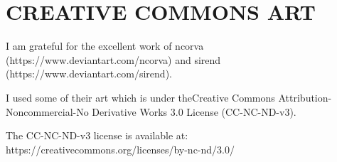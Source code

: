 \onecolumn
\chapter{CREATIVE COMMONS ART}


\noindent I am grateful for the excellent work of ncorva (https://www.deviantart.com/ncorva) and sirend\\(https://www.deviantart.com/sirend).

\vspace{1em}

\noindent I used some of their art which is under theCreative Commons Attribution-Noncommercial-No Derivative Works 3.0 License (CC-NC-ND-v3).

\vspace{1em}

\noindent The CC-NC-ND-v3 license is available at: https://creativecommons.org/licenses/by-nc-nd/3.0/
